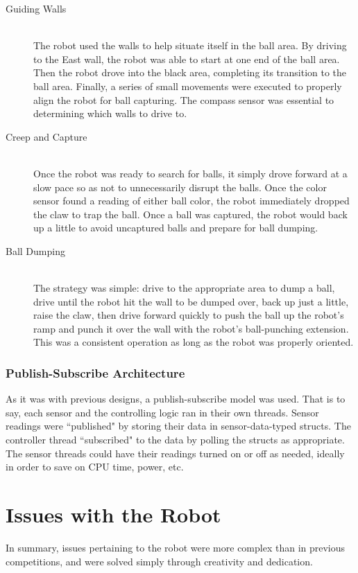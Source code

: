 \documentclass{article}
\begin{document}
\begin{description}
  \item[Guiding Walls] \hfill \\
  The robot used the walls to help situate itself in the ball area. By driving to the East wall, the robot was able to start at one end of the ball area. Then the robot drove into the black area, completing its transition to the ball area. Finally, a series of small movements were executed to properly align the robot for ball capturing. The compass sensor was essential to determining which walls to drive to.

  \item[Creep and Capture] \hfill \\
  Once the robot was ready to search for balls, it simply drove forward at a slow pace so as not to unnecessarily disrupt the balls. Once the color sensor found a reading of either ball color, the robot immediately dropped the claw to trap the ball. Once a ball was captured, the robot would back up a little to avoid uncaptured balls and prepare for ball dumping.

  \item[Ball Dumping] \hfill \\
  The strategy was simple: drive to the appropriate area to dump a ball, drive until the robot hit the wall to be dumped over, back up just a little, raise the claw, then drive forward quickly to push the ball up the robot's ramp and punch it over the wall with the robot's ball-punching extension. This was a consistent operation as long as the robot was properly oriented.
\end{description}

\subsubsection{Publish-Subscribe Architecture}
As it was with previous designs, a publish-subscribe model was used. That is to say, each sensor and the controlling logic ran in their own threads. Sensor readings were ``published" by storing their data in sensor-data-typed structs. The controller thread ``subscribed" to the data by polling the structs as appropriate. The sensor threads could have their readings turned on or off as needed, ideally in order to save on CPU time, power, etc.

\newpage
\section{Issues with the Robot}
In summary, issues pertaining to the robot were more complex than in previous competitions, and were solved simply through creativity and dedication.
\end{document}
